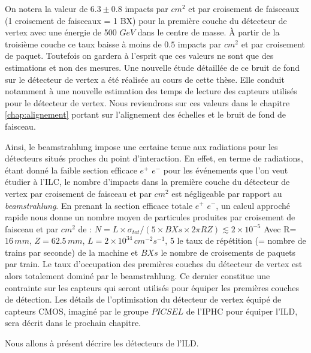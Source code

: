   \medskip
  
  On notera la valeur de $6.3 \pm 0.8$ impacts par $cm^2$ et par croisement de faisceaux (1 croisement de faisceaux = 1 BX) pour la premi\`ere couche du détecteur de vertex avec une \'energie de 500 $GeV$ dans le centre de masse. \`A partir de la troisi\`eme couche ce taux baisse \`a moins de $0.5$ impacts par $cm^2$ et par croisement de paquet. Toutefois on gardera \`a l'esprit que ces valeurs ne sont que des estimations et non des mesures. Une nouvelle \'etude d\'etaill\'ee de ce bruit de fond sur le d\'etecteur de vertex a \'et\'e r\'ealis\'ee au cours de cette th\`ese. Elle conduit notamment \`a une nouvelle estimation des temps de lecture des capteurs utilis\'es pour le d\'etecteur de vertex. Nous reviendrons sur ces valeurs dans le chapitre \ref{chap:alignement} portant sur l'alignement des \'echelles et le bruit de fond de faisceau.
  
  \medskip

  Ainsi, le beamstrahlung impose une certaine tenue aux radiations pour les d\'etecteurs situ\'es proches du point d'interaction. En effet, en terme de radiations, \'etant donn\'e la faible section efficace $e^+$ $e^-$ pour les \'ev\'enements que l'on veut \'etudier \`a l'ILC, le nombre d'impacts dans la premi\`ere couche du d\'etecteur de vertex par croisement de faisceau et par $cm^2$ est n\'egligeable par rapport au \textit{beamstrahlung}. En prenant la section efficace totale $e^+$ $e^-$, un calcul approch\'e rapide nous donne un nombre moyen de particules produites par croisement de faisceau et par $cm^2$ de : $N = L \times \sigma_{tot} / (5 \times BXs \times 2\pi R Z) \lesssim 2 \times 10^{-5} $ Avec R=$16 \, mm$, $Z = 62.5 \, mm$, $L = 2 \times 10^{34} \, cm^{-2}s^{-1}$, 5 le taux de r\'ep\'etition (= nombre de trains par seconde) de la machine et $BXs$ le nombre de croisements de paquets par train. Le taux d'occupation des premi\`eres couches du d\'etecteur de vertex est alors totalement domin\'e par le beamstrahlung. Ce dernier constitue une contrainte sur les capteurs qui seront utilis\'es pour \'equiper les premi\`eres couches de d\'etection. Les détails de l'optimisation du d\'etecteur de vertex \'equip\'e de capteurs CMOS, imagin\'e par le groupe $PICSEL$ de l'IPHC pour \'equiper l'ILD, sera d\'ecrit dans le prochain chapitre.
  
  \medskip
  
  Nous allons \`a pr\'esent d\'ecrire les d\'etecteurs de l'ILD.
  
